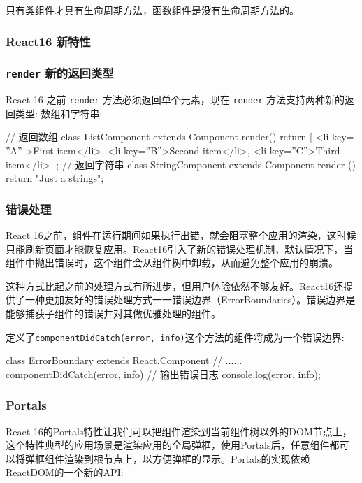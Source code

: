只有类组件才具有生命周期方法，函数组件是没有生命周期方法的。

\subsubsection{React16 新特性}

\subsubsection*{\texttt{render} 新的返回类型}

React 16 之前 \texttt{render} 方法必须返回单个元素，现在 \texttt{render} 方法支持两种新的返回类型: 数组和字符串:

\begin{JavaScript}
// 返回数组
class ListComponent extends Component{ 
  render() {
    return [ 
      <li key= ”A” >First item</li>, 
      <li key=”B”>Second item</li>, 
      <li key=”C”>Third item</li> 
    ];
  }
}
// 返回字符串
class StringComponent extends Component { 
  render () { 
    return "Just a strings"; 
  }
}
\end{JavaScript}

\subsubsection*{错误处理}

React 16之前，组件在运行期间如果执行出错，就会阻塞整个应用的渲染，这时候只能刷新页面才能恢复应用。React16引入了新的错误处理机制，默认情况下，当组件中抛出错误时，这个组件会从组件树中卸载，从而避免整个应用的崩溃。

这种方式比起之前的处理方式有所进步，但用户体验依然不够友好。React16还提供了一种更加友好的错误处理方式一一错误边界（ErrorBoundaries）。错误边界是能够捕获子组件的错误井对其做优雅处理的组件。

定义了\texttt{componentDidCatch(error, info)}这个方法的组件将成为一个错误边界:

\begin{JavaScript}
class ErrorBoundary extends React.Component {
  // ......
  componentDidCatch(error, info) { 
    // 输出错误日志
    console.log(error, info);
  }
}
\end{JavaScript}

\subsubsection*{Portals}

React 16的Portals特性让我们可以把组件渲染到当前组件树以外的DOM节点上，这个特性典型的应用场景是渲染应用的全局弹框，使用Portals后，任意组件都可以将弹框组件渲染到根节点上，以方便弹框的显示。Portals的实现依赖ReactDOM的一个新的API:

